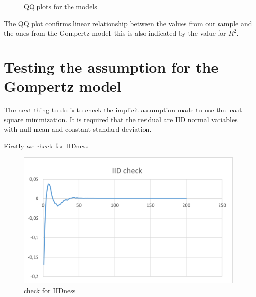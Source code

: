 \begin{figure}[H]
    \centering
    \qquad
    \caption{QQ plots for the models}
\end{figure}




The QQ plot confirms linear relationship between the values from our sample and the ones from the Gompertz model, this is also indicated by the value for $R^2$.

\section{Testing the assumption for the Gompertz model}
The next thing to do is to check the implicit assumption made to use the least square minimization. It is required that the residual are IID normal variables with null mean and constant standard deviation.

Firstly we check for IIDness.
\begin{figure}[H]
\centering
    \includegraphics[width= 1\textwidth]{./images/IIDcheck200.png}
    \caption{check for IIDness}
    \label{fig:coverage-percentage}
\end{figure}

